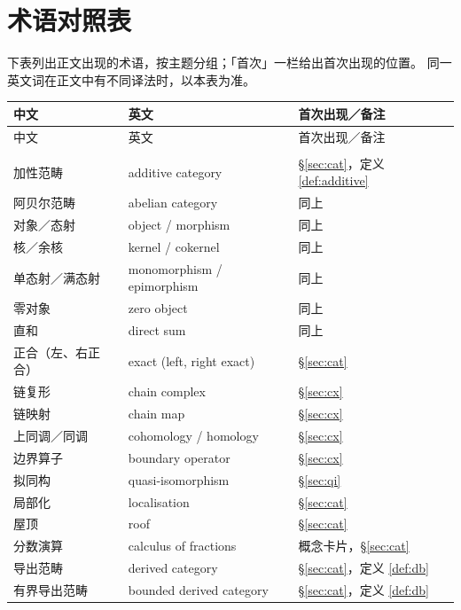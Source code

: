 \section{术语对照表}\label{app:terms}

下表列出正文出现的术语，按主题分组；「首次」一栏给出首次出现的位置。
同一英文词在正文中有不同译法时，以本表为准。

{\small
\renewcommand{\arraystretch}{1.28}
\begin{longtable}{@{}p{4.2cm}p{5.0cm}p{4.8cm}@{}}
\toprule
中文 & 英文 & 首次出现／备注\\
\midrule
\endfirsthead
\toprule
中文 & 英文 & 首次出现／备注\\
\midrule
\endhead
\bottomrule
\endlastfoot
\multicolumn{3}{@{}l}{\textbf{一、范畴与同调代数}}\\
加性范畴 & additive category & \S\ref{sec:cat}，定义 \ref{def:additive}\\
阿贝尔范畴 & abelian category & 同上\\
对象／态射 & object / morphism & 同上\\
核／余核 & kernel / cokernel & 同上\\
单态射／满态射 & monomorphism / epimorphism & 同上\\
零对象 & zero object & 同上\\
直和 & direct sum & 同上\\
正合（左、右正合） & exact (left, right exact) & \S\ref{sec:cat}\\
链复形 & chain complex & \S\ref{sec:cx}\\
链映射 & chain map & \S\ref{sec:cx}\\
上同调／同调 & cohomology / homology & \S\ref{sec:cx}\\
边界算子 & boundary operator & \S\ref{sec:cx}\\
拟同构 & quasi-isomorphism & \S\ref{sec:qi}\\
局部化 & localisation & \S\ref{sec:cat}\\
屋顶 & roof & \S\ref{sec:cat}\\
分数演算 & calculus of fractions & 概念卡片，\S\ref{sec:cat}\\
导出范畴 & derived category & \S\ref{sec:cat}，定义 \ref{def:db}\\
有界导出范畴 & bounded derived category & \S\ref{sec:cat}，定义 \ref{def:db}\\

\end{longtable}}
